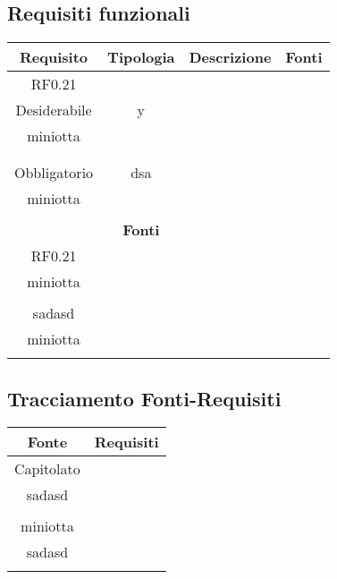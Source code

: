 \documentclass{scalatekids-article}
\begin{document}
\subsection{Requisiti funzionali}
\begin{longtable}[H]
\centering
\caption{Tabella requisiti funzionali}
\begin{tabular}{|c|c|c|c|}
\hline
\textbf{Requisito} & \textbf{Tipologia} & \textbf{Descrizione} & \textbf{Fonti}\\
\hline
RF0.21 & \multiLineCell{Tecnologico\\Desiderabile} & y & \multiLineCell{Capitolato\\miniotta\\}\\
\hline
\end{longtable}sadasd & \multiLineCell{Funzionale\\Obbligatorio} & dsa & \multiLineCell{Capitolato\\miniotta\\}\\
\hline
\end{longtable}\subsection{Tracciamento Requisiti-Fonti}
\begin{longtable}[H]
\centering
\caption{Tabella Requisiti-Fonti}
\begin{tabular}{|c|c|}
\hline
\textbf{Requisito} & \textbf{Fonti}\\
\hline
RF0.21 & \multiLineCell[t]{Capitolato\\miniotta\\}\\
\hline
sadasd & \multiLineCell[t]{Capitolato\\miniotta\\}\\
\hline
\end{tabular}
\end{longtable}
\subsection{Tracciamento Fonti-Requisiti}
\begin{longtable}[H]
\centering
\caption{Tabella Fonti-Requisiti}
\begin{tabular}{|c|c|}
\hline
\textbf{Fonte} & \textbf{Requisiti}\\
\hline
Capitolato & \multiLineCell[t]{RF0.21\\sadasd\\}\\
\hline
miniotta & \multiLineCell[t]{RF0.21\\sadasd\\}\\
\hline
\end{tabular}
\end{longtable}
\end{document}
